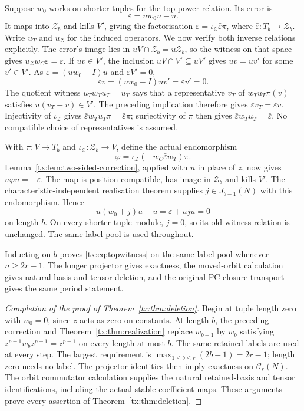 \documentclass[11pt,a4paper,oneside,openany]{book}
\theoremstyle{definition}\newtheorem{definition}[theorem]{Definition}
\theoremstyle{remark}\newtheorem{remark}[theorem]{Remark}
\numberwithin{equation}{chapter}
\begin{document}
Suppose $w_0$ works on shorter tuples for the top-power relation. Its error is
\[\varepsilon=uw_0u-u.
\]
It maps into $\mathcal Z_b$ and kills $V'$, giving the factorisation
$\varepsilon=\iota_{\mathcal Z}\bar\varepsilon\pi$, where
$\bar\varepsilon:T_b\to\mathcal Z_b$. Write $u_T$ and
$u_{\mathcal Z}$ for the induced operators. We now verify both inverse
relations explicitly. The error's image lies in
$uV\cap\mathcal Z_b=u\mathcal Z_b$, so the witness on that
space gives $u_{\mathcal Z}w_C\bar\varepsilon=\bar\varepsilon$.
If $uv\in V'$, the
inclusion $uV\cap V'\subseteq uV'$ gives $uv=uv'$ for some
$v'\in V'$. As $\varepsilon=(uw_0-I)u$ and $\varepsilon V'=0$,
\[
                  \varepsilon v=(uw_0-I)uv'
                                  =\varepsilon v'=0.
\]
The quotient witness $u_Tw_Tu_T=u_T$ says that a representative
$v_T$ of $w_Tu_T\pi(v)$ satisfies $u(v_T-v)\in V'$. The preceding
implication therefore gives $\varepsilon v_T=\varepsilon v$.
Injectivity of $\iota_{\mathcal Z}$ gives
$\bar\varepsilon w_Tu_T\pi=\bar\varepsilon\pi$; surjectivity of
$\pi$ then gives $\bar\varepsilon w_Tu_T=\bar\varepsilon$.
No compatible choice of representatives is assumed.

With $\pi:V\to T_b$ and $\iota_{\mathcal Z}:\mathcal Z_b\to V$,
define the actual endomorphism
\[
       \varphi=\iota_{\mathcal Z}
                      (-w_C\bar\varepsilon w_T)\pi.
\]
Lemma~\ref{tx:lem:two-sided-correction}, applied with $u$ in place
of $z$, now gives $u\varphi u=-\varepsilon$. The map
is position-compatible, has image in $\mathcal Z_b$ and kills $V'$.
The characteristic-independent realisation theorem supplies
$j\in J_{b-1}(N)$ with this endomorphism. Hence
\[
        u(w_0+j)u-u=\varepsilon+uju=0
\]
on length $b$. On every shorter tuple module, $j=0$, so its old
witness relation is unchanged. The same label pool is used throughout.

Inducting on $b$ proves \eqref{tx:eq:topwitness} on the same label pool whenever $n\ge2r-1$. The longer projector gives exactness, the moved-orbit calculation gives natural basis and tensor deletion, and the original PC closure transport gives the same period statement.


\begin{proof}[Completion of the proof of Theorem~\ref{tx:thm:deletion}]
Begin at tuple length zero with $w_0=0$, since $z$ acts as zero on
constants. At length $b$, the preceding correction and
Theorem~\ref{tx:thm:realization} replace $w_{b-1}$ by $w_b$ satisfying
$z^{p-1}w_bz^{p-1}=z^{p-1}$ on every length at most $b$. The same
retained labels are used at every step. The largest requirement is
$\max_{1\le b\le r}(2b-1)=2r-1$; length zero needs no label.
The projector identities then imply exactness on $\mathcal C_r(N)$.
The orbit commutator calculation supplies the natural retained-basis
and tensor identifications, including the actual stable coefficient
maps. These arguments prove every assertion of Theorem~\ref{tx:thm:deletion}.
\end{proof}
\end{document}
